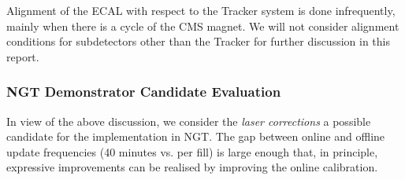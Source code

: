 Alignment of the ECAL with respect to the Tracker system is done infrequently,
mainly when there is a cycle of the CMS magnet.
We will not consider alignment conditions for subdetectors other than the Tracker for further discussion in this report.

\subsubsection{NGT Demonstrator Candidate Evaluation    }

In view of the above discussion, we consider the \emph{laser corrections} a possible candidate for the implementation in NGT.
The gap between online and offline update frequencies (40 minutes vs. per fill) is large enough that, in principle, expressive improvements can be realised by improving the online calibration.
